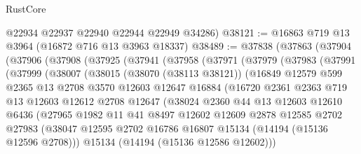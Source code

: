 \begin{lexlean}{RustCore}
\begin{coremodule}
      @22934
      @22937
      @22940
      @22944
      @22949
      @34286)
@38121 := @16863 @719 @13 @3964 (@16872 @716 @13 @3963 @18337)
@38489 := @37838
    (@37863
      (@37904
        (@37906
          (@37908
            (@37925
              (@37941
                (@37958
                  (@37971
                    (@37979
                      (@37983
                        (@37991
                          (@37999
                            (@38007
                              (@38015
                                (@38070 (@38113 @38121))
                                (@16849
                                  @12579
                                  @599
                                  @2365
                                  @13
                                  @2708
                                  @3570
                                  @12603
                                  @12647
                                  @16884
                                  (@16720
                                    @2361
                                    @2363
                                    @719
                                    @13
                                    @12603
                                    @12612
                                    @2708
                                    @12647
                                    (@38024
                                      @2360
                                      @44
                                      @13
                                      @12603
                                      @12610
                                      @6436
                                      (@27965
                                        @1982
                                        @11
                                        @41
                                        @8497
                                        @12602
                                        @12609
                                        @2878
                                        @12585
                                        @2702
                                        @27983
                                        (@38047
                                          @12595
                                          @2702
                                          @16786
                                          @16807
                                          @15134
                                          (@14194 (@15136 @12596 @2708)))
                                        @15134
                                        (@14194 (@15136 @12586 @12602)))

\end{coremodule}
\end{lexlean}
